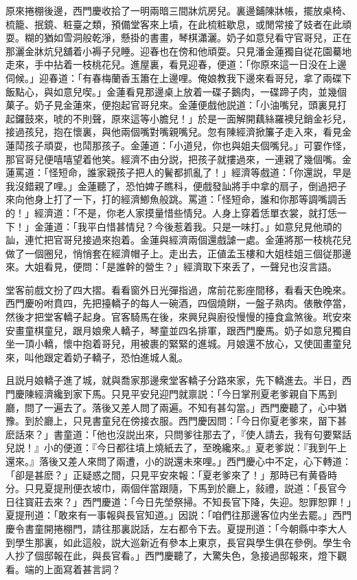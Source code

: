原來捲棚後邊，西門慶收拾了一明兩暗三間牀炕房兒。裏邊鋪陳牀帳，擺放桌椅、梳籠、抿鏡、粧臺之類，預備堂客來上墳，在此梳粧歇息，或閒常接了妓者在此頑耍。糊的猶如雪洞般乾淨，懸掛的書畫，琴棋瀟灑。奶子如意兒看守官哥兒，正在那灑金牀炕兒舖着小褥子兒睡。迎春也在傍和他頑耍。只見潘金蓮獨自従花園驀地走來，手中拈着一枝桃花兒。進屋裏，看見迎春，便道：「你原來這一日没在上邊伺候。」迎春道：「有春梅蘭香玉簫在上邊哩。俺娘教我下邊來看哥兒，拿了兩碟下飯點心，與如意兒喫。」金蓮看見那邊桌上放着一碟子鵝肉，一碟蹄子肉，並幾個菓子。奶子見金蓮來，便抱起官哥兒來。金蓮便戲他説道：「小油嘴兒，頭裏見打起鑼鼓來，唬的不則聲，原來這等小膽兒！」於是一面解開藕絲羅襖兒銷金衫兒，接過孩兒，抱在懷裏，與他兩個嘴對嘴親嘴兒。忽有陳經濟掀簾子走入來，看見金蓮鬦孩子頑耍，也鬦那孩子。金蓮道：「小道兒，你也與姐夫個嘴兒。」可霎作怪，那官哥兒便嘻嘻望着他笑。經濟不由分説，把孩子就摟過來，一連親了幾個嘴。金蓮罵道：「怪短命，誰家親孩子把人的鬢都抓亂了！」經濟等戲道：「你還説，早是我沒錯親了哩。」金蓮聽了，恐怕婢子瞧科，便戲發訕將手中拿的扇子，倒過把子來向他身上打了一下，打的經濟鯽魚般跳。罵道：「怪短命，誰和你那等調嘴調舌的！」經濟道：「不是，你老人家摸量惜些情兒。人身上穿着恁單衣裳，就打恁一下！」金蓮道：「我平白惜甚情兒？今後惹着我。只是一味打。」如意兒見他頑的訕，連忙把官哥兒接過來抱着。金蓮與經濟兩個還戲謔一處。金蓮將那一枝桃花兒做了一個圈兒，悄悄套在經濟帽子上。走出去，正値孟玉樓和大姐桂姐三個従那邊來。大姐看見，便問：「是誰幹的營生？」經濟取下來丢了，一聲兒也沒言語。

堂客前戲文扮了四大摺。看看窗外日光彈指過，席前花影座間移，看看天色晚來。西門慶吩咐賁四，先把擡轎子的每人一碗酒，四個燒餅，一盤子熟肉。俵散停當，然後才把堂客轎子起身。官客騎馬在後，來興兒與廚役慢慢的擡食盒煞後。玳安來安畫童棋童兒，跟月娘衆人轎子，琴童並四名排軍，跟西門慶馬。奶子如意兒獨自坐一頂小轎，懷中抱着哥兒，用被裹的緊緊的進城。月娘還不放心，又使囬畫童兒來，叫他跟定着奶子轎子，恐怕進城人亂。

且説月娘轎子進了城，就與喬家那邊衆堂客轎子分路來家，先下轎進去。半日，西門慶陳經濟纔到家下馬。只見平安兒迎門就禀説：「今日掌刑夏老爹親自下馬到廳，問了一遍去了。落後又差人問了兩遍。不知有甚勾當。」西門慶聽了，心中猶豫。到於廳上，只見書童兒在傍接衣服。西門慶因問：「今日你夏老爹來，㽞下甚麽話來？」書童道：「他也沒説出來，只問爹往那去了，『使人請去，我有句要緊話兒説！』小的便道：『今日都往墳上燒紙去了，至晚纔來。』夏老爹説：『我到午上還來。』落後又差人來問了兩遭，小的説還未來哩。」西門慶心中不定，心下轉道：「卻是甚麽？」正疑惑之間，只見平安來報：「夏老爹來了！」那時已有黄昏時分。只見夏提刑便衣坡巾，兩個伴當跟隨，下馬到於廳上，敍禮，説道：「長官今日往寳莊去來？」西門慶道：「今日先塋祭掃。不知長官下降，失迎。恕罪恕罪！」夏提刑道：「敢來有一事報與長官知道。」因説：「咱們往那邊客位内坐去罷。」西門慶令書童開捲棚門，請往那裏説話，左右都令下去。夏提刑道：「今朝縣中李大人到學生那裏，如此這般，説大巡新近有參本上東京，長官與學生俱在參例。學生令人抄了個邸報在此，與長官看。」西門慶聽了，大驚失色，急接過邸報來，燈下觀看。端的上面寫着甚言詞？

